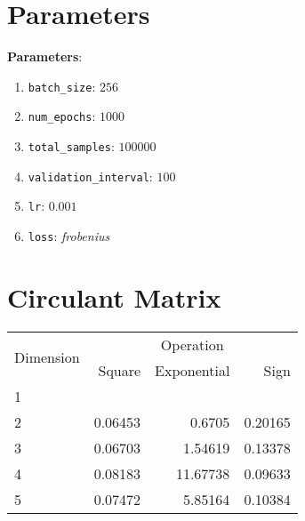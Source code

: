\documentclass{article}
\begin{document}
\section{Parameters}
\textbf{Parameters}:
{
\begin{enumerate}
    \item \texttt{batch\_size}: $256$
    \item \texttt{num\_epochs}: $1000$
    \item \texttt{total\_samples}: $100000$
    \item \texttt{validation\_interval}: $100$
    \item \texttt{lr}: $0.001$
    \item \texttt{loss}: \textit{frobenius}
\end{enumerate}
}
\pagebreak



\section{Circulant Matrix}
\begin{tabular}{@{}lrrr@{}}
\toprule
\multirow{2}{*}{Dimension} & \multicolumn{3}{c}{Operation} \\
\cmidrule(l){2-4}
& Square & Exponential & Sign \\
\midrule
1 & & & \\
2 & 0.06453 & 0.6705 & 0.20165 \\
3 & 0.06703 & 1.54619 & 0.13378 \\
4 & 0.08183 & 11.67738 & 0.09633 \\
5 & 0.07472 & 5.85164 & 0.10384 \\
\bottomrule
\end{tabular}
\end{document}
